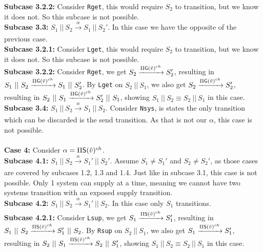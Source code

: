 \indent \indent \textbf{Subcase 3.2.2: } Consider \texttt{Rget}, this would require $S_2$ to transition, but we know it does not. So this subcase is not possible.\\
\indent \textbf{Subcase 3.3: }$S_1 \ || \ S_2 \xrightarrow[]{\alpha} S_1 \ || \ S_2'$. In this case we have the opposite of the previous case.\\
\indent \indent \textbf{Subcase 3.2.1: } Consider \texttt{Lget}, this would require $S_2$ to transition, but we know it does not. So this subcase is not possible.\\ 
\indent \indent \textbf{Subcase 3.2.2: } Consider \texttt{Rget}, we get $S_2 \xrightarrow[]{\Pi \mathsf{G}(\Tilde{v})^{ch}} S_2'$, resulting in $S_1 \ || \ S_2 \xrightarrow[]{\Pi \mathsf{G}(\Tilde{v})^{ch}} S_1 \ || \ S_2'$. By \texttt{Lget} on $S_2\ ||\ S_1$, we also get $S_2 \xrightarrow[]{\Pi \mathsf{G}(\Tilde{v})^{ch}} S_2'$, resulting in $S_2 \ || \ S_1 \xrightarrow[]{\Pi \mathsf{G}(\Tilde{v})^{ch}} S_2' \ || \ S_1$, showing $S_1 \ || \ S_2 \equiv S_2\ ||\ S_1$ in this case.\\
\indent \textbf{Subcase 3.4:} $S_1 \ || \ S_2 \xrightarrow[]{\alpha} S_1 \ || \ S_2$. Consider \texttt{Nsys}, is states the only transition which can be discarded is the send transition. As that is not our $\alpha$, this case is not possible.\\
\\
\textbf{Case 4: } Consider $\alpha = \Pi \mathsf{S}(\Tilde{v})^{ch}$.\\
\indent \textbf{Subcase 4.1: }$S_1 \ || \ S_2 \xrightarrow[]{\alpha} S_1' \ || \ S_2'$. Assume $S_1\not= S_1'$ and $S_2\not= S_2'$, as those cases are covered by subcases 1.2, 1.3 and 1.4. Just like in subcase 3.1, this case is not possible. Only 1 system can supply at a time, meaning we cannot have two systems transition with an exposed supply transition. \\
\indent \textbf{Subcase 4.2: }$S_1 \ || \ S_2 \xrightarrow[]{\alpha} S_1' \ || \ S_2$. In this case only $S_1$ transitions. \\ 
\indent \indent \textbf{Subcase 4.2.1: } Consider \texttt{Lsup}, we get $S_1 \xrightarrow[]{\Pi \mathsf{S}(\Tilde{v})^{ch}} S_1'$, resulting in $S_1 \ || \ S_2 \xrightarrow[]{\Pi \mathsf{S}(\Tilde{v})^{ch}} S_1' \ || \ S_2$. By \texttt{Rsup} on $S_2\ ||\ S_1$, we also get $S_1 \xrightarrow[]{\Pi \mathsf{S}(\Tilde{v})^{ch}} S_1'$, resulting in $S_2 \ || \ S_1 \xrightarrow[]{\Pi \mathsf{S}(\Tilde{v})^{ch}} S_2 \ || \ S_1'$, showing $S_1 \ || \ S_2 \equiv S_2\ ||\ S_1$ in this case.\\
